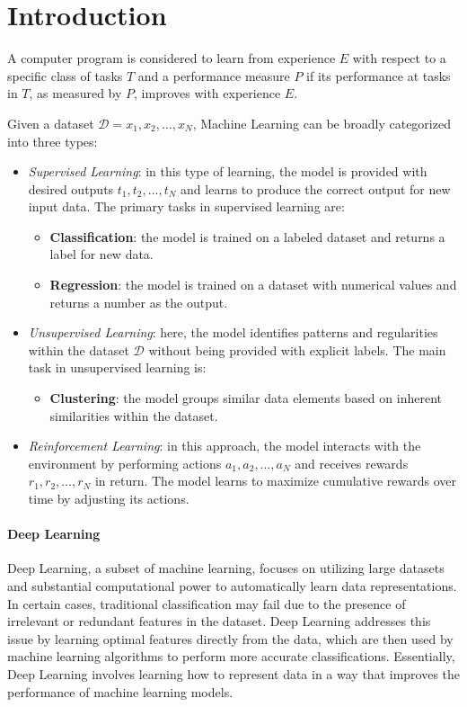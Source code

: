 \section{Introduction}

\begin{definition}
    A computer program is considered to learn from experience $E$ with respect to a specific class of tasks $T$ and a performance measure $P$ if its performance at tasks in $T$, as measured by $P$, improves with experience $E$.
\end{definition}
Given a dataset $\mathcal{D} = {x_1, x_2, \dots, x_N}$, Machine Learning can be broadly categorized into three types:
\begin{itemize} 
    \item \textit{Supervised Learning}: in this type of learning, the model is provided with desired outputs ${t_1, t_2, \dots, t_N}$ and learns to produce the correct output for new input data. 
        The primary tasks in supervised learning are: 
        \begin{itemize} 
            \item \textbf{Classification}: the model is trained on a labeled dataset and returns a label for new data. 
            \item \textbf{Regression}: the model is trained on a dataset with numerical values and returns a number as the output. 
        \end{itemize} 
    \item \textit{Unsupervised Learning}: here, the model identifies patterns and regularities within the dataset $\mathcal{D}$ without being provided with explicit labels. 
        The main task in unsupervised learning is: 
        \begin{itemize} 
            \item \textbf{Clustering}: the model groups similar data elements based on inherent similarities within the dataset. 
        \end{itemize} 
    \item \textit{Reinforcement Learning}: in this approach, the model interacts with the environment by performing actions ${a_1, a_2, \dots, a_N}$ and receives rewards ${r_1, r_2, \dots, r_N}$ in return. 
        The model learns to maximize cumulative rewards over time by adjusting its actions. 
\end{itemize}

\paragraph*{Deep Learning}
Deep Learning, a subset of machine learning, focuses on utilizing large datasets and substantial computational power to automatically learn data representations. 
In certain cases, traditional classification may fail due to the presence of irrelevant or redundant features in the dataset. 
Deep Learning addresses this issue by learning optimal features directly from the data, which are then used by machine learning algorithms to perform more accurate classifications. 
Essentially, Deep Learning involves learning how to represent data in a way that improves the performance of machine learning models.